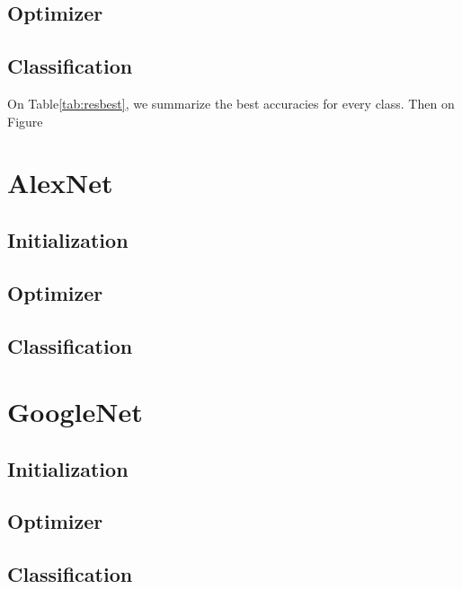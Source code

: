 \subsection{Optimizer}
\subsection{Classification}
On Table\ref{tab:resbest}, we summarize the best accuracies for every class. Then on Figure
\section{AlexNet}\label{sec:aleX}
\subsection{Initialization}
\subsection{Optimizer}
\subsection{Classification}
\section{GoogleNet}\label{sec:gogl}
\subsection{Initialization}
\subsection{Optimizer}
\subsection{Classification}
